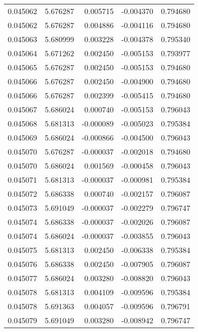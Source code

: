\begin{tabular}{lrrrr}
0.045062    &  5.676287 &  0.005715 & -0.004370 &             0.794680 \\
0.045062    &  5.676287 &  0.004886 & -0.004116 &             0.794680 \\
0.045063    &  5.680999 &  0.003228 & -0.004378 &             0.795340 \\
0.045064    &  5.671262 &  0.002450 & -0.005153 &             0.793977 \\
0.045065    &  5.676287 &  0.002450 & -0.005153 &             0.794680 \\
0.045066    &  5.676287 &  0.002450 & -0.004900 &             0.794680 \\
0.045066    &  5.676287 &  0.002399 & -0.005415 &             0.794680 \\
0.045067    &  5.686024 &  0.000740 & -0.005153 &             0.796043 \\
0.045068    &  5.681313 & -0.000089 & -0.005023 &             0.795384 \\
0.045069    &  5.686024 & -0.000866 & -0.004500 &             0.796043 \\
0.045070    &  5.676287 & -0.000037 & -0.002018 &             0.794680 \\
0.045070    &  5.686024 &  0.001569 & -0.000458 &             0.796043 \\
0.045071    &  5.681313 & -0.000037 & -0.000981 &             0.795384 \\
0.045072    &  5.686338 &  0.000740 & -0.002157 &             0.796087 \\
0.045073    &  5.691049 & -0.000037 & -0.002279 &             0.796747 \\
0.045074    &  5.686338 & -0.000037 & -0.002026 &             0.796087 \\
0.045074    &  5.686024 & -0.000037 & -0.003855 &             0.796043 \\
0.045075    &  5.681313 &  0.002450 & -0.006338 &             0.795384 \\
0.045076    &  5.686338 &  0.002450 & -0.007905 &             0.796087 \\
0.045077    &  5.686024 &  0.003280 & -0.008820 &             0.796043 \\
0.045078    &  5.681313 &  0.004109 & -0.009596 &             0.795384 \\
0.045078    &  5.691363 &  0.004057 & -0.009596 &             0.796791 \\
0.045079    &  5.691049 &  0.003280 & -0.008942 &             0.796747 \\

\end{tabular}
